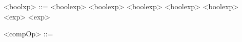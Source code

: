 \begin{grammarEx}
	<bool\textunderscore xp> ::= <bool\textunderscore exp> \lit{\&\&} <bool\textunderscore exp>
	\alt <bool\textunderscore exp> \lit{\textbar\textbar} <bool\textunderscore exp>
	\alt \lit{!} <bool\textunderscore exp>
	\alt <exp>  <exp>
	\alt {}
	\alt {}

	<compOp> ::= \lit{\textless{}}
	\alt \lit{\textless{}=}
	\alt \lit{\textgreater{}}
	\alt \lit{\textgreater{}=}
	\alt \lit{==}
	\alt \lit{!=}
\end{grammarEx}